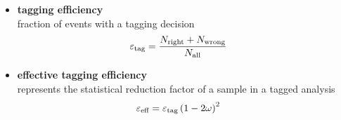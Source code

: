 {\begin{itemize}
\vspace{-1.1em}
\item \textbf{tagging efficiency} \\[0.04cm] 
fraction of events with a tagging decision
\begin{equation*}
\hspace{-1.6em}
\varepsilon_\text{tag}=\frac{N_{\text{right}}+N_{\text{wrong}}}{N_{\text{all}}}
\end{equation*}
\vspace{-1.1em}
\item \textbf{effective tagging efficiency} \\[0.04cm] 
represents the statistical reduction factor of a sample in a tagged analysis
\vspace{-0.3em}
\begin{equation*}
\hspace{-1.6em}
\vspace{0.5em}
\varepsilon_\text{eff}=\varepsilon_\text{tag}\left(1-2\omega\right)^2
\end{equation*}
\end{itemize}


}
